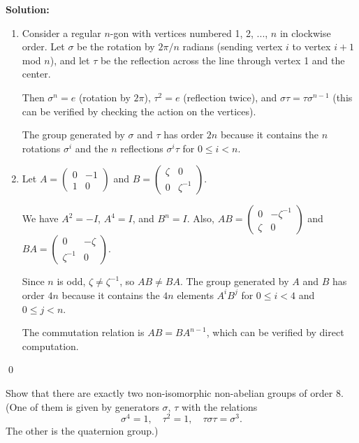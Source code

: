 \noindent\textbf{Solution:}
\begin{enumerate}[label=(\alph*)]
\item Consider a regular $n$-gon with vertices numbered 1, 2, ..., $n$ in clockwise order. Let $\sigma$ be the rotation by $2\pi/n$ radians (sending vertex $i$ to vertex $i+1$ mod $n$), and let $\tau$ be the reflection across the line through vertex 1 and the center.

Then $\sigma^n = e$ (rotation by $2\pi$), $\tau^2 = e$ (reflection twice), and $\sigma\tau = \tau\sigma^{n-1}$ (this can be verified by checking the action on the vertices).

The group generated by $\sigma$ and $\tau$ has order $2n$ because it contains the $n$ rotations $\sigma^i$ and the $n$ reflections $\sigma^i\tau$ for $0 \leq i < n$.

\item Let $A = \begin{pmatrix} 0 & -1 \\ 1 & 0 \end{pmatrix}$ and $B = \begin{pmatrix} \zeta & 0 \\ 0 & \zeta^{-1} \end{pmatrix}$.

We have $A^2 = -I$, $A^4 = I$, and $B^n = I$. Also, $AB = \begin{pmatrix} 0 & -\zeta^{-1} \\ \zeta & 0 \end{pmatrix}$ and $BA = \begin{pmatrix} 0 & -\zeta \\ \zeta^{-1} & 0 \end{pmatrix}$.

Since $n$ is odd, $\zeta \neq \zeta^{-1}$, so $AB \neq BA$. The group generated by $A$ and $B$ has order $4n$ because it contains the $4n$ elements $A^iB^j$ for $0 \leq i < 4$ and $0 \leq j < n$.

The commutation relation is $AB = BA^{n-1}$, which can be verified by direct computation.
\end{enumerate}


\qed
\begin{problembox}
Show that there are exactly two non-isomorphic non-abelian groups of order 8. (One of them is given by generators $\sigma$, $\tau$ with the relations
\[\sigma^4 = 1, \quad \tau^2 = 1, \quad \tau\sigma\tau = \sigma^3.\]
The other is the quaternion group.)
\end{problembox}


